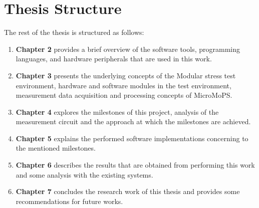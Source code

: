 \newpage
\section{Thesis Structure}

The rest of the thesis is structured as follows:

\begin{enumerate}
    \item \textbf{Chapter 2} provides a brief overview of the software tools, programming languages, and hardware peripherals that are used in this work.   
    \item \textbf{Chapter 3} presents the underlying concepts of the Modular stress test environment, hardware and software modules in the test environment, measurement data acquisition and processing concepts of MicroMoPS. 
    \item \textbf{Chapter 4} explores the milestones of this project, analysis of the measurement circuit and the approach at which the milestones are achieved.
    \item \textbf{Chapter 5} explains the performed software implementations concerning to the mentioned milestones. 
    \item \textbf{Chapter 6} describes the results that are obtained from performing this work and some analysis with the existing systems.  
    \item \textbf{Chapter 7} concludes the research work of this thesis and provides some recommendations for future works.
\end{enumerate}
